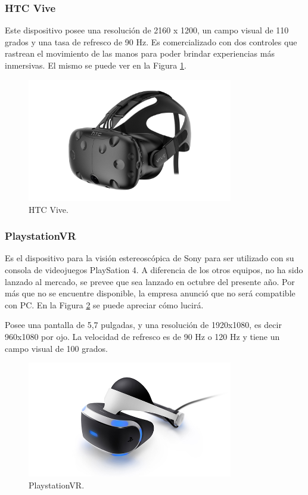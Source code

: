 \documentclass[12pt]{article}
\begin{document}
\subsubsection{HTC Vive}
Este dispositivo posee una resolución de 2160 x 1200, un campo visual de 110 grados y una tasa de refresco de 90 Hz. Es comercializado con dos controles que rastrean el movimiento de las manos para poder brindar experiencias más inmersivas\cite{htcvive}. El mismo se puede ver en la Figura \ref{htcV}.
\begin{figure}[h!]
\includegraphics[width=0.8\textwidth,center]{htc.png}
\caption{HTC Vive.}
\label{htcV}
\end{figure}
\subsubsection{PlaystationVR}
Es el dispositivo para la visión estereoscópica de Sony para ser utilizado con su consola de videojuegos PlaySation 4. A diferencia de los otros equipos, no ha sido lanzado al mercado, se prevee que sea lanzado en octubre del presente año. Por más que no se encuentre disponible, la empresa anunció que no será compatible con PC. En la Figura \ref{psvr} se puede apreciar cómo lucirá.

Posee una pantalla de 5,7 pulgadas, y una resolución de 1920x1080, es decir 960x1080 por ojo. La velocidad de refresco es de 90 Hz o 120 Hz y tiene un campo visual de 100 grados\cite{psvrspecs}.
\clearpage
\begin{figure}[h!]
\includegraphics[width=0.8\textwidth,center]{psvr.jpg}
\caption{PlaystationVR.}
\label{psvr}
\end{figure}
\end{document}
